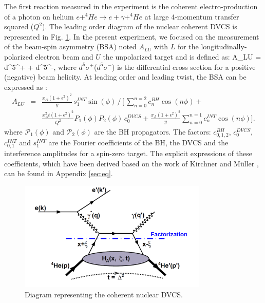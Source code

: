 \documentclass{article}
\let\oldequation\equation
\let\oldendequation\endequation
\renewenvironment{equation}
  {\linenomathNonumbers\oldequation}
  {\oldendequation\endlinenomath}
\begin{document}
The first reaction measured in the experiment is the coherent electro-production of a photon on helium
$e+^4\!\!He \rightarrow e+\gamma+^4\!\!He$ at large 4-momentum transfer squared ($Q^2$). The 
leading order diagram of the nuclear coherent DVCS is represented in Fig. \ref{fig:CohDiag}.
In the present experiment, we focused on the measurement of the beam-spin asymmetry (BSA) 
noted $A_{LU}$ with 
$L$ for the longitudinally-polarized electron beam and $U$ the unpolarized target and is defined as:  
\begin{equation}
A_{LU} = 
              {d^{5}\sigma^{+} + d^{5}\sigma^{-}},
  \label{eq:BSA}
\end{equation}
where $d^{5}\sigma^{+}$($d^{5}\sigma^{-}$) is the differential cross section for a positive 
(negative) beam helicity. At leading order and leading twist, the BSA can be expressed as \cite{Kirchner:2003wt}:        
\begin{eqnarray}
\label{eq:coh_BSA}
A_{LU}& =& \frac{x_A(1+\epsilon^2)^2}{y} \, s_1^{INT} \sin(\phi) \, 
\bigg/ \, \bigg[ \, \sum_{n=0}^{n=2}c_n^{BH}\cos{(n\phi)} +  \\
& & \frac{x_A^2 t {(1+\epsilon^2)}^2}{Q^2} P_1(\phi) P_2(\phi) \, c_0^{DVCS} + 
\frac{x_A (1+\epsilon^2)^2}{y} \sum_{n=0}^{n=1} c_n^{INT} \cos{(n\phi)} \bigg].  \nonumber 
\end{eqnarray}
where $\mathcal{P}_1(\phi)$ and $\mathcal {P}_2(\phi)$ are the BH 
propagators. The factors: $c_{0,1,2}^{BH}$, $c_0^{DVCS}$, $c_{0,1}^{INT}$ and 
$s_1^{INT}$ are the Fourier coefficients of the BH, the DVCS and the 
interference amplitudes for a spin-zero target. The explicit 
expressions of these coefficients, which have been derived based on the work of 
Kirchner and Müller \cite{Kirchner:2003wt}, can be found in Appendix \ref{sec:eq}.

\begin{figure}[tbp!]
\center
\includegraphics[width=9cm]{fig3/DVCS_diagram.pdf}
\caption{Diagram representing the coherent nuclear DVCS.}
\label{fig:CohDiag}
\end{figure}
\end{document}
